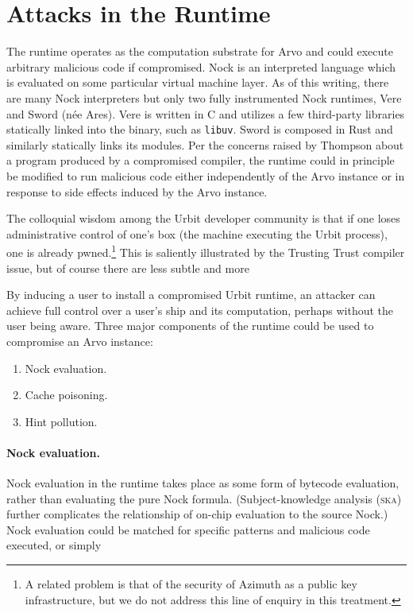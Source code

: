 \documentclass[twoside]{article}
\begin{document}
\section{Attacks in the Runtime}

The runtime operates as the computation substrate for Arvo and could execute arbitrary malicious code if compromised.  Nock is an interpreted language which is evaluated on some particular virtual machine layer.  As of this writing, there are many Nock interpreters \cite{Nock2023} but only two fully instrumented Nock runtimes, Vere and Sword (née Ares).  Vere is written in C and utilizes a few third-party libraries statically linked into the binary, such as \texttt{libuv}.  Sword is composed in Rust and similarly statically links its modules.  Per the concerns raised by Thompson about a program produced by a compromised compiler, the runtime could in principle be modified to run malicious code either independently of the Arvo instance or in response to side effects induced by the Arvo instance.

The colloquial wisdom among the Urbit developer community is that if one loses administrative control of one's box (the machine executing the Urbit process), one is already pwned.\footnote{A related problem is that of the security of Azimuth as a public key infrastructure, but we do not address this line of enquiry in this treatment.}  This is saliently illustrated by the Trusting Trust compiler issue, but of course there are less subtle and more


By inducing a user to install a compromised Urbit runtime, an attacker can achieve full control over a user's ship and its computation, perhaps without the user being aware.  Three major components of the runtime could be used to compromise an Arvo instance:

\begin{enumerate}
  \item  Nock evaluation.
  \item  Cache poisoning.
  \item  Hint pollution.
\end{enumerate}

\paragraph{Nock evaluation.}  Nock evaluation in the runtime takes place as some form of bytecode evaluation, rather than evaluating the pure Nock formula.  (Subject-knowledge analysis (\textsc{ska}) further complicates the relationship of on-chip evaluation to the source Nock.)  Nock evaluation could be matched for specific patterns and malicious code executed, or simply
\end{document}
